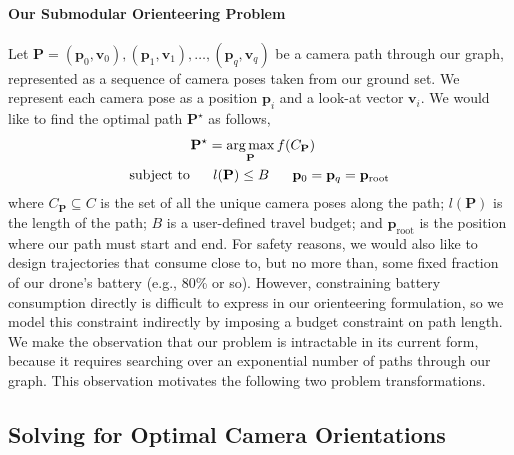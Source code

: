 \paragraph{Our Submodular Orienteering Problem}
Let $\mathbf{P} = (\mathbf{p}_0, \mathbf{v}_0), (\mathbf{p}_1, \mathbf{v}_1), \ldots, (\mathbf{p}_q, \mathbf{v}_q)$ be a camera path through our graph, represented as a sequence of camera poses taken from our ground set.
We represent each camera pose as a position $\mathbf{p}_i$ and a look-at vector $\mathbf{v}_i$.
We would like to find the optimal path $\mathbf{P}^{\star}$ as follows,
%
\begin{equation}
\begin{aligned}
\mathbf{P}^{\star} = \operatorname*{arg\,max}_{\mathbf{P}} f(C_{\mathbf{P}})~~~~~~~~~~~~~~~~\\
\text{subject to} ~~~~~ l(\mathbf{P}) \leq B ~~~~~ \mathbf{p}_0 = \mathbf{p}_q = \mathbf{p}_\text{root}
\end{aligned}
\label{eqn:ch4:submodular_orienteering}
\end{equation}
%
where
$C_\mathbf{P} \subseteq C$ is the set of all the unique camera poses along the path; 
$l(\mathbf{P})$ is the length of the path; $B$ is a user-defined travel budget; and $\mathbf{p}_\text{root}$ is the position where our path must start and end.
For safety reasons, we would also like to design trajectories that consume close to, but no more than, some fixed fraction of our drone's battery (e.g., 80\% or so). However, constraining battery consumption directly is difficult to express in our orienteering formulation, so we model this constraint indirectly by imposing a budget constraint on path length.
We make the observation that our problem is intractable in its current form, because it requires searching over an exponential number of paths through our graph. This observation motivates the following two problem transformations.

\subsection{Solving for Optimal Camera Orientations} 
\label{sec:ch4:trajectories_orientation}


